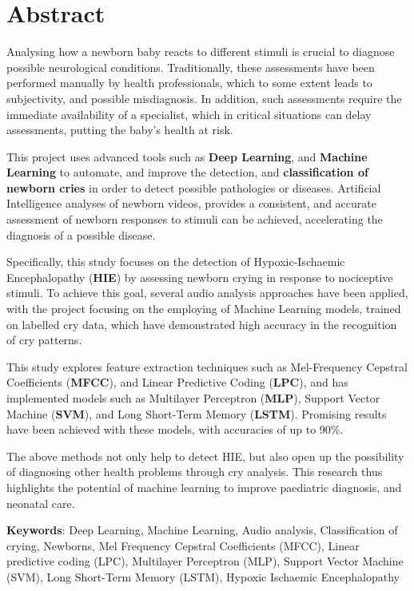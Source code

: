 %

\section*{Abstract}
\label{sec::abstract}

Analysing how a newborn baby reacts to different stimuli is crucial to diagnose possible neurological conditions. Traditionally, these assessments have been performed manually by health professionals, which to some extent leads to subjectivity, and possible misdiagnosis. In addition, such assessments require the immediate availability of a specialist, which in critical situations can delay assessments, putting the baby's health at risk.

This project uses advanced tools such as \textbf{Deep Learning}, and \textbf{Machine Learning} to automate, and improve the detection, and \textbf{classification of newborn cries} in order to detect possible pathologies or diseases. Artificial Intelligence analyses of newborn videos, provides a consistent, and accurate assessment of newborn responses to stimuli can be achieved, accelerating the diagnosis of a possible disease.  

Specifically, this study focuses on the detection of Hypoxic-Ischaemic Encephalopathy (\textbf{HIE}) by assessing newborn crying in response to nociceptive stimuli. To achieve this goal, several audio analysis approaches have been applied, with the project focusing on the employing of Machine Learning models, trained on labelled cry data, which have demonstrated high accuracy in the recognition of cry patterns.

This study explores feature extraction techniques such as Mel-Frequency Cepstral Coefficients (\textbf{MFCC}), and Linear Predictive Coding (\textbf{LPC}), and has implemented models such as Multilayer Perceptron (\textbf{MLP}), Support Vector Machine (\textbf{SVM}), and Long Short-Term Memory (\textbf{LSTM}). Promising results have been achieved with these models, with accuracies of up to 90\%.

The above methods not only help to detect HIE, but also open up the possibility of diagnosing other health problems through cry analysis. This research thus highlights the potential of machine learning to improve paediatric diagnosis, and neonatal care.

\vspace{\baselineskip}
\textbf{Keywords}: Deep Learning, Machine Learning, Audio analysis, Classification of crying, Newborns, Mel Frequency Cepstral Coeﬃcients (MFCC), Linear predictive coding (LPC), Multilayer Perceptron (MLP), Support Vector Machine (SVM), Long Short-Term Memory (LSTM), Hypoxic Ischaemic Encephalopathy


